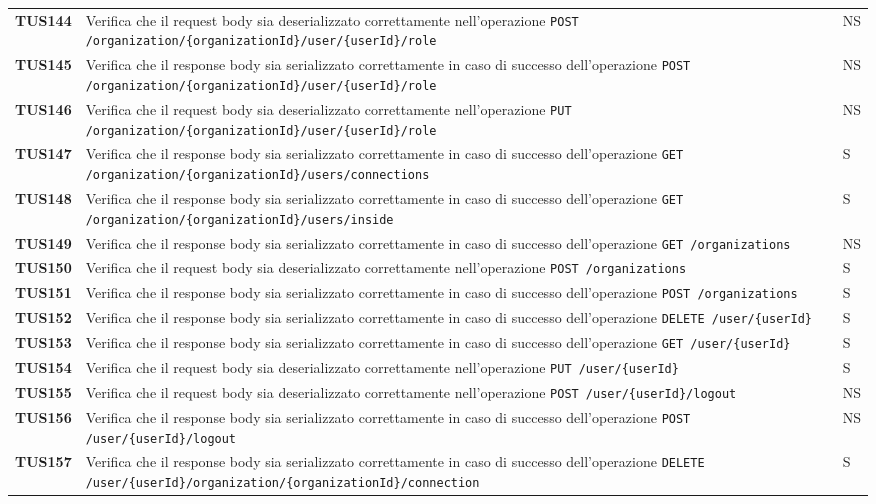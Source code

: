 \documentclass[../../piano-di-qualifica.tex]{subfiles}
\begin{document}
\begin{longtable}[H]{>{\centering\bfseries}m{3cm} >{}m{10cm} >{\centering\arraybackslash}m{3cm}}
  TUS144 & Verifica che il request body sia deserializzato correttamente nell'operazione \verb|POST /organization/{organizationId}/user/{userId}/role| & NS \\
  TUS145 & Verifica che il response body sia serializzato correttamente in caso di successo dell'operazione \verb|POST /organization/{organizationId}/user/{userId}/role| & NS \\
  TUS146 & Verifica che il request body sia deserializzato correttamente nell'operazione \verb|PUT /organization/{organizationId}/user/{userId}/role| & NS \\
  TUS147 & Verifica che il response body sia serializzato correttamente in caso di successo dell'operazione \verb|GET /organization/{organizationId}/users/connections| & S \\
  TUS148 & Verifica che il response body sia serializzato correttamente in caso di successo dell'operazione \verb|GET /organization/{organizationId}/users/inside| & S \\
  TUS149 & Verifica che il response body sia serializzato correttamente in caso di successo dell'operazione \verb|GET /organizations| & NS \\
  TUS150 & Verifica che il request body sia deserializzato correttamente nell'operazione \verb|POST /organizations| & S \\
  TUS151 & Verifica che il response body sia serializzato correttamente in caso di successo dell'operazione \verb|POST /organizations| & S \\
  TUS152 & Verifica che il response body sia serializzato correttamente in caso di successo dell'operazione \verb|DELETE /user/{userId}| & S \\
  TUS153 & Verifica che il response body sia serializzato correttamente in caso di successo dell'operazione \verb|GET /user/{userId}| & S \\
  TUS154 & Verifica che il request body sia deserializzato correttamente nell'operazione \verb|PUT /user/{userId}| & S \\
  TUS155 & Verifica che il request body sia deserializzato correttamente nell'operazione \verb|POST /user/{userId}/logout| & NS \\
  TUS156 & Verifica che il response body sia serializzato correttamente in caso di successo dell'operazione \verb|POST /user/{userId}/logout| & NS \\
  TUS157 & Verifica che il response body sia serializzato correttamente in caso di successo dell'operazione \verb|DELETE /user/{userId}/organization/{organizationId}/connection| & S \\

\end{longtable}
\end{document}
